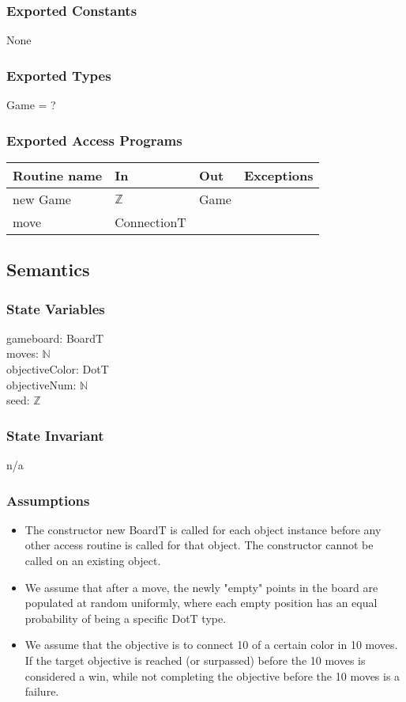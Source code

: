 \documentclass[12pt]{article}
\begin{document}
\subsubsection* {Exported Constants}
None

\subsubsection* {Exported Types}
Game = ?

\subsubsection* {Exported Access Programs}
\begin{tabular}{| l | l | l | l |}
\hline
\textbf{Routine name} & \textbf{In} & \textbf{Out} & \textbf{Exceptions}\\
\hline
new Game & $\mathbb{Z}$ & Game & \\
\hline
move & ConnectionT & ~ & ~\\
\hline
\end{tabular}


\subsection* {Semantics}
\subsubsection* {State Variables}
gameboard: BoardT \\
moves: $\mathbb{N}$ \\
objectiveColor: DotT \\
objectiveNum: $\mathbb{N}$ \\
seed: $\mathbb{Z}$

\subsubsection* {State Invariant}
n/a

\subsubsection* {Assumptions}
\begin{itemize}
    \item The constructor new BoardT is called for each object instance before
    any other access routine is called for that object.  The constructor cannot
    be called on an existing object.

    \item We assume that after a move, the newly "empty" points in the board
    are populated at random uniformly, where each empty position has an
    equal probability of being a specific DotT type.

    \item We assume that the objective is to connect 10 of a certain color in 10
    moves. If the target objective is reached (or surpassed) before the 10
    moves is considered a win, while not completing the objective before the 10
    moves is a failure.
\end{itemize}
\end{document}
